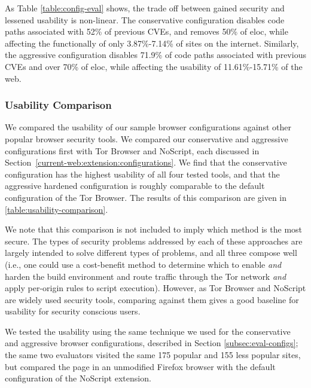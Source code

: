 As Table \ref{table:config-eval} shows, the trade off between gained security
and lessened usability is non-linear.  The conservative configuration disables
code paths associated with 52\% of previous CVEs, and removes 50\% of
\gls{eloc}, while affecting the functionally of
only 3.87\%-7.14\% of sites on the internet.  Similarly, the aggressive
configuration disables 71.9\% of code paths associated with previous CVEs and
over 70\% of \gls{eloc}, while affecting the usability
of 11.61\%-15.71\% of the web.


\subsubsection{Usability Comparison}
\label{current-web:extension:usability-comparison}



We compared the usability of our sample browser configurations against
other popular browser security tools.  We compared our conservative and
aggressive configurations first with Tor Browser and NoScript, each discussed
in Section~\ref{current-web:extension:configurations}.  We find that the conservative
configuration has the highest usability of all four tested tools, and that
the aggressive hardened configuration is roughly comparable to the default
configuration of the Tor Browser.  The results of this comparison are given in
\ref{table:usability-comparison}.

We note that this comparison is not included to imply which method is the most
secure.  The types of security problems addressed by each of these approaches
are largely intended to solve different types of problems, and all three compose
well (i.e., one could use a cost-benefit method to determine which \WASs to enable
\textit{and} harden the build environment and route traffic through the Tor
network \textit{and} apply per-origin rules to script execution).  However, as
Tor Browser and NoScript are widely used security tools, comparing against them
gives a good baseline for usability for security conscious users.

We tested the usability using the same technique we used for the conservative
and aggressive browser configurations, described in Section
\ref{subsec:eval-configs}; the same two evaluators visited the
same 175 popular and 155 less popular sites, but compared the page in
an unmodified Firefox browser with the default configuration of the NoScript
extension.

